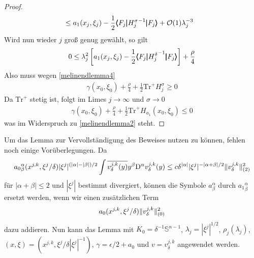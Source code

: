 \begin{proof}
\begin{align}
\begin{split}
&\le a_1(x_j,\xi_j) - \frac 1 2\pmb\langle F_j\pmb|{H_j^\sigma}^{-1}\pmb|F_j\pmb\rangle  + \mathcal O(1)\lambda_j^{-3}
\end{split}
\end{align}
Wird nun wieder $j$ groß genug gewählt, so gilt
\begin{align}
0\le \lambda_j^2\left[ a_1(x_j,\xi_j) - \frac{1}{2}\pmb\langle F_j\pmb|{H_j^\delta}^{-1}\pmb|F_j\pmb\rangle \right]  +\frac\rho 4
\end{align}
Also muss wegen \eqref{melinendlemma4}
\begin{align}
\gamma(x_0,\xi_0) + \frac \rho 4 + \frac 1 2 \mathrm{Tr}^+ H_j^\sigma\ge 0
\end{align}
Da $\mathrm{Tr}^+$ stetig ist, folgt im Limes $j\to\infty$ und $\sigma\to 0$
\begin{align}
\gamma(x_0,\xi_0) + \frac \rho 4 + \frac 1 2 \mathrm{Tr}^+ H_{a_1}(x_0,\xi_0)\le 0
\end{align}
was im Widerspruch zu \eqref{melinendlemma2} steht.
\end{proof}

Um das Lemma zur Vervollständigung des Beweises nutzen zu können, fehlen noch einige Vorüberlegungen. Da
\begin{align}
{a_0}^\alpha_\beta(x^{j,k},\xi^j/\delta)|\xi^j|^{(|\alpha|-|\beta|)/2}\int \overline{v^{j,k}_\delta(y)}y^\beta\mathrm D^\alpha v^{j,k}_\delta(y) \le c \delta^{\lvert\alpha\rvert}|\xi^j|^{-|\alpha+\beta|/2}\lVert v^{j,k}_\delta\rVert_{(2)}^2
\end{align}
für $|\alpha+\beta|\le 2$ und $|\xi^j|$ bestimmt divergiert, können die Symbole $a^\alpha_\beta$ durch ${a_1}^\alpha_\beta$ ersetzt werden, wenn wir einen zusätzlichen Term
\begin{align}
{a_0}(x^{j,k},\xi^j/\delta)\lVert v^{j,k}_\delta\rVert_{(0)}^2
\end{align}
dazu addieren. Nun kann das Lemma mit $K_0=\delta^{-1}\mathbb{S}^{n-1}$, $\lambda_j=|\xi^j|^{1/2}$, $\rho_j(\lambda_j)$, $(x,\xi)=(x^{j,k},\xi^j/\delta|\xi^j|^{-1})$, $\gamma = \epsilon/2 + a_0$ und $v=v^{j,k}_\delta$ angewendet werden.
